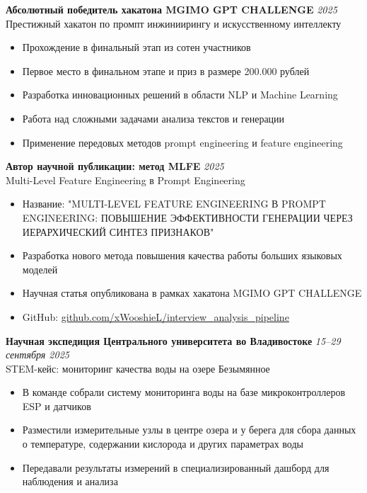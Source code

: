 \documentclass[11pt,a4paper]{article}
\newcommand{\hlblue}[1]{\textcolor{pastelblue}{#1}}
\newcommand{\hlgreen}[1]{\textcolor{pastelgreen}{#1}}
\newcommand{\achievement}[4]{
  \par\noindent
  \begin{minipage}{\textwidth}
  \textbf{\color{primarycolor}#1} \hfill {\color{secondarycolor}\textit{#2}}\\
  {\color{secondarycolor}#3}
  \vspace{2pt}

  #4
  \end{minipage}
  \vspace{4pt}
}
\begin{document}
\achievement
  {Абсолютный победитель хакатона MGIMO GPT CHALLENGE}
  {2025}
  {Престижный хакатон по промпт инжиниирингу и искусственному интеллекту}
  {
    \begin{itemize}
      \item Прохождение в \hlblue{финальный этап} из сотен участников
      \item Первое место в финальном этапе и приз в размере 200.000 рублей
      \item Разработка инновационных решений в области NLP и Machine Learning
      \item Работа над сложными задачами анализа текстов и генерации
      \item Применение передовых методов prompt engineering и feature engineering
    \end{itemize}
  }

\achievement
  {Автор научной публикации: метод MLFE}
  {2025}
  {Multi-Level Feature Engineering в Prompt Engineering}
  {
    \begin{itemize}
      \item \hlgreen{Название:} "MULTI-LEVEL FEATURE ENGINEERING В PROMPT ENGINEERING: ПОВЫШЕНИЕ ЭФФЕКТИВНОСТИ ГЕНЕРАЦИИ ЧЕРЕЗ ИЕРАРХИЧЕСКИЙ СИНТЕЗ ПРИЗНАКОВ"
      \item Разработка нового метода повышения качества работы больших языковых моделей
      \item Научная статья опубликована в рамках хакатона MGIMO GPT CHALLENGE
      \item GitHub: \href{https://github.com/xWooshieL/interview_analysis_pipeline/blob/main/MLFE\%20Novitskiy.pdf}{github.com/xWooshieL/interview\_analysis\_pipeline}
    \end{itemize}
  }

\achievement
  {Научная экспедиция Центрального университета во Владивостоке}
  {15--29 сентября 2025}
  {STEM-кейс: мониторинг качества воды на озере Безымянное}
  {
    \begin{itemize}
      \item В команде собрали систему мониторинга воды на базе микроконтроллеров ESP и датчиков
      \item Разместили измерительные узлы в центре озера и у берега для сбора данных о температуре, содержании кислорода и других параметрах воды
      \item Передавали результаты измерений в специализированный дашборд для наблюдения и анализа
    \end{itemize}
  }
\end{document}
